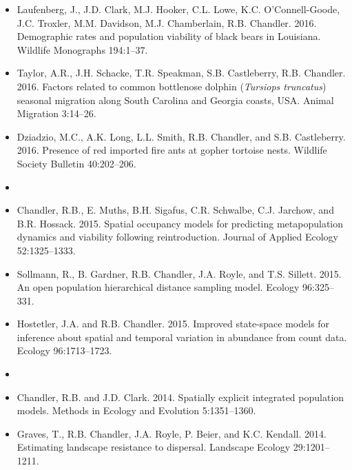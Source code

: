 \begin{itemize}
\item Laufenberg, J., J.D. Clark, M.J. Hooker, C.L. Lowe,
  K.C. O'Connell-Goode, J.C. Troxler, M.M. Davidson, M.J. Chamberlain,
  R.B. Chandler. 2016. Demographic rates and population viability
  of black bears in Louisiana. Wildlife Monographs 194:1--37.

\item Taylor, A.R., J.H. Schacke, T.R. Speakman, S.B. Castleberry,
  R.B. Chandler. 2016. Factors related to common bottlenose dolphin
  ({\it Tursiops truncatus}) seasonal migration along South Carolina
  and Georgia coasts, USA. Animal Migration 3:14--26.

\item Dziadzio, M.C., A.K. Long, L.L. Smith, R.B. Chandler, and
  S.B. Castleberry. 2016. Presence of red imported fire ants at
  gopher tortoise nests. Wildlife Society Bulletin 40:202--206.  


\item[] { \\}

\item Chandler, R.B., E. Muths, B.H. Sigafus, C.R. Schwalbe,
  C.J. Jarchow, and B.R. Hossack. 2015. Spatial occupancy models for
  predicting metapopulation dynamics and viability following
  reintroduction. Journal of Applied Ecology 52:1325--1333.

\item Sollmann, R., B. Gardner, R.B. Chandler, J.A. Royle, and
  T.S. Sillett. 2015. An open population hierarchical
  distance sampling model. Ecology 96:325--331.

\item Hostetler, J.A. and R.B. Chandler. 2015. Improved
  state-space models for inference about spatial and temporal
  variation in abundance from count data. Ecology 96:1713--1723.

\item[] { \\}

\item Chandler, R.B. and J.D. Clark. 2014. Spatially
  explicit integrated population models. Methods in Ecology and
  Evolution 5:1351--1360.

\item Graves, T., R.B. Chandler, J.A. Royle, P. Beier, and
  K.C. Kendall. 2014. Estimating landscape resistance to
  dispersal. Landscape Ecology 29:1201--1211.


\end{itemize}
